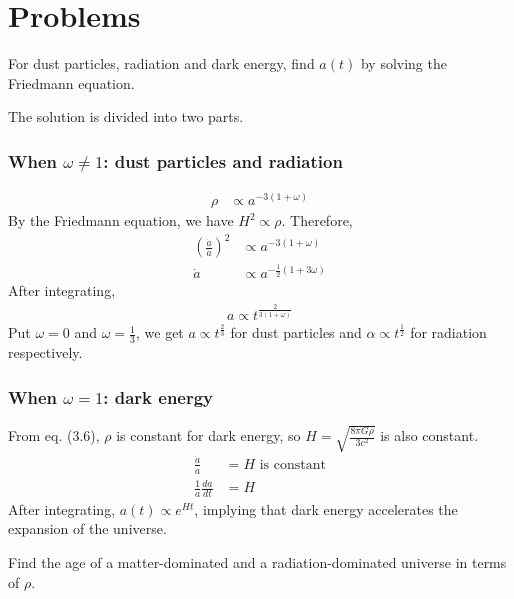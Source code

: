 \documentclass[12pt]{book} %
\numberwithin{equation}{chapter}
\def\a{\alpha}
\def\w{\omega}
\begin{document}
\section*{Problems}
\begin{problem}
\label{Problem 3.1}
For dust particles, radiation and dark energy, find $a(t)$ by solving the Friedmann equation.
\end{problem}

\begin{solbox}
The solution is divided into two parts.

\subsubsection*{When $\w\neq 1$: dust particles and radiation}
\begin{align*}
\rho&\propto a^{-3(1+\w)}
\end{align*}
By the Friedmann equation, we have $H^2\propto \rho$. Therefore,
\begin{align*}
{\left(\frac{\dot{a}}{a}\right)}^{2}&\propto a^{-3(1+\w)}\\
\dot{a}&\propto a^{-\frac{1}{2}(1+3\w)}
\end{align*}
After integrating,
\begin{align*}
a\propto t^{\frac{2}{3(1+\w)}}
\end{align*}
Put $\w=0$ and $\w=\frac{1}{3}$, we get $a\propto t^{\frac{2}{3}}$ for dust particles and $\a\propto t^{\frac{1}{2}}$ for radiation respectively.

\subsubsection*{When $\w=1$: dark energy}
From eq. (3.6), $\rho$ is constant for dark energy, so $H=\sqrt{\frac{8\pi G\rho}{3c^{2}}}$ is also constant.
\begin{align*}
\frac{\dot{a}}{a}&=H\text{  is constant}\\
\frac{1}{a}\frac{da}{dt}&=H
\end{align*}
After integrating, $a(t)\propto e^{Ht}$, implying that dark energy accelerates the expansion of the universe.
\end{solbox}

\begin{problem}
Find the age of a matter-dominated and a radiation-dominated universe in terms of $\rho$.
\end{problem}
\end{document}
